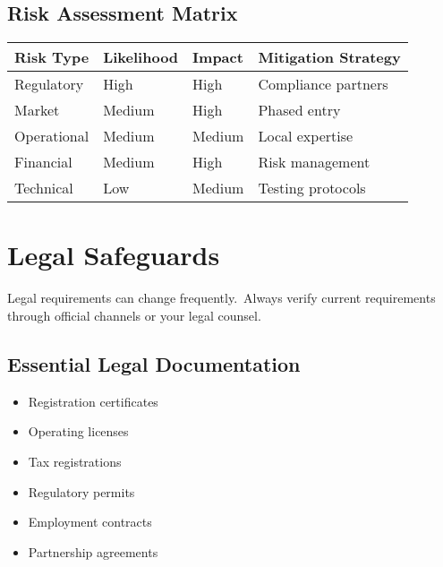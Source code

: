 \subsection{Risk Assessment Matrix}
\begin{center}
\begin{tabularx}{\textwidth}{>{\raggedright\arraybackslash}X >{\centering\arraybackslash}X >{\centering\arraybackslash}X >{\raggedright\arraybackslash}X}
    \toprule
    \textbf{Risk Type} & \textbf{Likelihood} & \textbf{Impact} & \textbf{Mitigation Strategy} \\
    \midrule
    Regulatory & High & High & Compliance partners \\
    Market & Medium & High & Phased entry \\
    Operational & Medium & Medium & Local expertise \\
    Financial & Medium & High & Risk management \\
    Technical & Low & Medium & Testing protocols \\
    \bottomrule
\end{tabularx}
\end{center}

\FloatBarrier
\section{Legal Safeguards}\label{sec:legal-safeguards}

\begin{warningbox}
Legal requirements can change frequently.\ Always verify current requirements through official channels or your legal counsel.
\end{warningbox}

\subsection{Essential Legal Documentation}\label{subsec:essential-legal-documentation}
\begin{tcolorbox}[colback=white,colframe=primarydark,title=\textbf{Documentation Checklist}]
\begin{itemize}
    \item Registration certificates
    \item Operating licenses
    \item Tax registrations
    \item Regulatory permits
    \item Employment contracts
    \item Partnership agreements
\end{itemize}
\end{tcolorbox}

